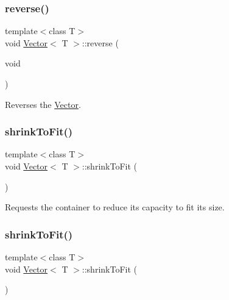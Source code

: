 \subsubsection{\texorpdfstring{reverse()}{reverse()}\hspace{0.1cm}{\footnotesize\ttfamily [2/2]}}
{\footnotesize\ttfamily template$<$class T$>$ \\
void \hyperlink{classVector}{Vector}$<$ T $>$\+::reverse (\begin{DoxyParamCaption}\item[{void}]{ }\end{DoxyParamCaption})\hspace{0.3cm}{\ttfamily [inline]}}

Reverses the \hyperlink{classVector}{Vector}. \mbox{\label{classVector_a170ee83bfb8dbfbf9587600012e2bb04}} 
\subsubsection{\texorpdfstring{shrink\+To\+Fit()}{shrinkToFit()}\hspace{0.1cm}{\footnotesize\ttfamily [1/2]}}
{\footnotesize\ttfamily template$<$class T$>$ \\
void \hyperlink{classVector}{Vector}$<$ T $>$\+::shrink\+To\+Fit (\begin{DoxyParamCaption}{ }\end{DoxyParamCaption})\hspace{0.3cm}{\ttfamily [inline]}}

Requests the container to reduce its capacity to fit its size. \mbox{\label{classVector_a170ee83bfb8dbfbf9587600012e2bb04}} 
\subsubsection{\texorpdfstring{shrink\+To\+Fit()}{shrinkToFit()}\hspace{0.1cm}{\footnotesize\ttfamily [2/2]}}
{\footnotesize\ttfamily template$<$class T$>$ \\
void \hyperlink{classVector}{Vector}$<$ T $>$\+::shrink\+To\+Fit (\begin{DoxyParamCaption}{ }\end{DoxyParamCaption})\hspace{0.3cm}{\ttfamily [inline]}}

